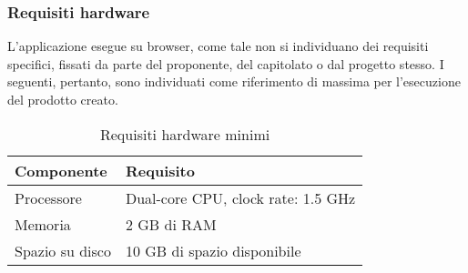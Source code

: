 \subsubsection{Requisiti hardware}
L’applicazione esegue su browser, come tale non si individuano dei requisiti specifici, fissati da parte
del proponente, del capitolato o dal progetto stesso. I seguenti, pertanto, sono individuati come
riferimento di massima per l’esecuzione del prodotto creato. 
\begin{table}[H]
    \centering
    \begin{tabular}{ll}
        \toprule
        \textbf{Componente} & \textbf{Requisito} \\
        \midrule
        Processore & Dual-core CPU, clock rate: 1.5 GHz \\
        Memoria & 2 GB di RAM \\
        Spazio su disco & 10 GB di spazio disponibile \\
        \bottomrule
    \end{tabular}
    \caption{Requisiti hardware minimi}
\end{table}